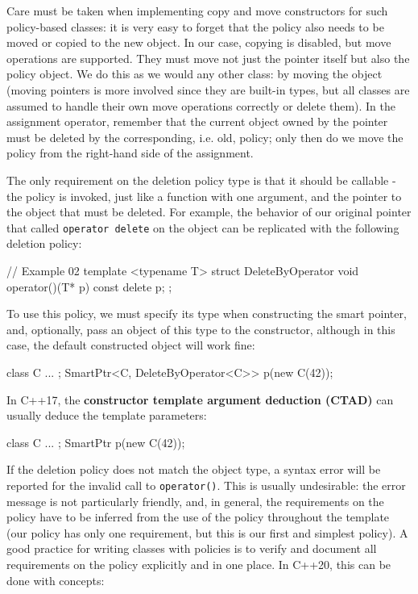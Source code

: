 Care must be taken when implementing copy and move constructors for such policy-based classes: it is very easy to forget that the policy also needs to be moved or copied to the new object. In our case, copying is disabled, but move operations are supported. They must move not just the pointer itself but also the policy object. We do this as we would any other class: by moving the object (moving pointers is more involved since they are built-in types, but all classes are assumed to handle their own move operations correctly or delete them). In the assignment operator, remember that the current object owned by the pointer must be deleted by the corresponding, i.e. old, policy; only then do we move the policy from the right-hand side of the assignment.

The only requirement on the deletion policy type is that it should be callable - the policy is invoked, just like a function with one argument, and the pointer to the object that must be deleted. For example, the behavior of our original pointer that called \texttt{operator\ delete} on the object can be replicated with the following deletion policy:

\begin{code}
// Example 02
template <typename T>
struct DeleteByOperator {
  void operator()(T* p) const {
    delete p;
  }
};
\end{code}

To use this policy, we must specify its type when constructing the smart pointer, and, optionally, pass an object of this type to the constructor, although in this case, the default constructed object will work fine:

\begin{code}
class C { ... };
SmartPtr<C, DeleteByOperator<C>> p(new C(42));
\end{code}

In C++17, the \textbf{constructor template argument deduction (CTAD)} can usually deduce the template parameters:

\begin{code}
class C { ... };
SmartPtr p(new C(42));
\end{code}

If the deletion policy does not match the object type, a syntax error will be reported for the invalid call to \texttt{operator()}. This is usually undesirable: the error message is not particularly friendly, and, in general, the requirements on the policy have to be inferred from the use of the policy throughout the template (our policy has only one requirement, but this is our first and simplest policy). A good practice for writing classes with policies is to verify and document all requirements on the policy explicitly and in one place. In C++20, this can be done with concepts:

